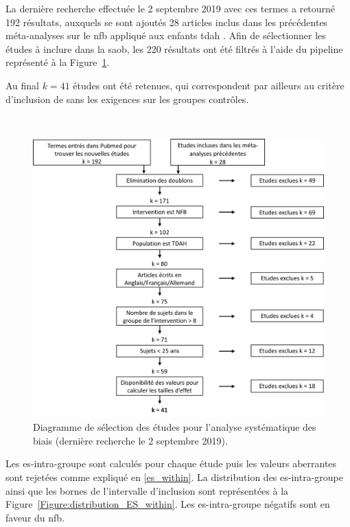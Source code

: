 La dernière recherche effectuée le 2 septembre 2019 avec ces termes a retourné 192 résultats, auxquels se sont ajoutés 28 articles inclus dans les précédentes 
méta-analyses sur le \gls{nfb} appliqué aux enfants \gls{tdah} \citep{Arns2009, Sonuga-Barke2013, Micoulaud2014, 
Cortese2016, Catala2017, VanDoren2019, Riesco2019, Bussalb2019clinical}. 
Afin de sélectionner les études à inclure dans la \gls{saob}, les 220 résultats ont été filtrés à l'aide du pipeline représenté à la 
Figure~\ref{Figure:factors_pipeline_selection_studies}. 

Au final $k = 41$ études ont été retenues, qui correspondent par ailleurs au critère d'inclusion de
\citet{Cortese2016} sans les exigences sur les groupes contrôles. 

\newpage\
\begin{figure}[h!]
  \centering
	\includegraphics[width=1\linewidth]{figures/chapter-3/factors-selection-studies} 
  \caption[Diagramme de sélection des études pour l'analyse systématique des biais.]{Diagramme de sélection des études pour l'analyse systématique des biais (dernière recherche le 2 septembre 2019).} 
  \label{Figure:factors_pipeline_selection_studies}
\end{figure}

Les \gls{es}-intra-groupe sont calculés pour chaque étude puis les valeurs aberrantes sont rejetées comme expliqué en \ref{es_within}. 
La distribution des \gls{es}-intra-groupe ainsi que les bornes de l'intervalle d'inclusion sont représentées à la 
Figure~\ref{Figure:distribution_ES_within}. Les \gls{es}-intra-groupe négatifs sont en faveur du \gls{nfb}.

